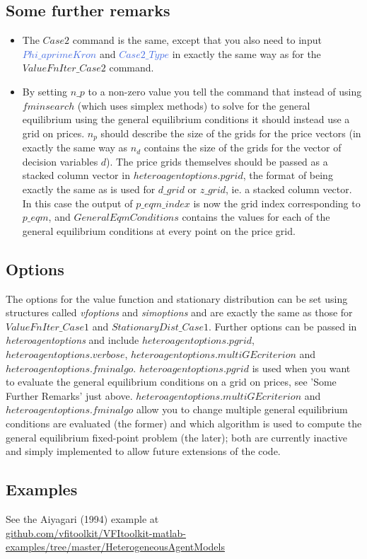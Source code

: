 \subsection{Some further remarks}
\begin{itemize}
 \item The $Case2$ command is the same, except that you also need to input \textcolor{RoyalBlue}{$Phi\_{}aprimeKron$} and \textcolor{RoyalBlue}{$Case2\_{}Type$}
   in exactly the same way as for the $ValueFnIter\_{}Case2$ command.
 \item By setting $n\_{}p$ to a non-zero value you tell the command that instead of using $fminsearch$ (which uses simplex methods) to solve
   for the general equilibrium using the general equilibrium conditions it should instead use a grid on prices. $n_p$ should describe the size of
   the grids for the price vectors (in exactly the same way as $n_d$ contains the size of the grids for the vector of decision variables $d$).
   The price grids themselves should be passed as a stacked column vector in $heteroagentoptions.pgrid$, the format of being exactly the same
   as is used for $d\_{}grid$ or $z\_{}grid$, ie. a stacked column vector. In this case the output of $p\_{}eqm\_{}index$ is now the grid
   index corresponding to $p\_{}eqm$, and $GeneralEqmConditions$ contains the values for each of the general equilibrium conditions at every point
   on the price grid.
\end{itemize}

\subsection{Options}
The options for the value function and stationary distribution can be set using structures called \textit{vfoptions}
and \textit{simoptions} and are exactly the same as those for $ValueFnIter\_{}Case1$ and $StationaryDist\_{}Case1$.
Further options can be passed in \textit{heteroagentoptions} and include $heteroagentoptions.pgrid$, \\
$heteroagentoptions.verbose$, $heteroagentoptions.multiGEcriterion$ and $heteroagentoptions.fminalgo$.
$heteroagentoptions.pgrid$ is used when you want to evaluate the general equilibrium conditions on a grid on prices, see
'Some Further Remarks' just above. $heteroagentoptions.multiGEcriterion$ and $heteroagentoptions.fminalgo$
allow you to change multiple general equilibrium conditions are evaluated (the former) and which algorithm is used
to compute the general equilibrium fixed-point problem (the later); both are currently inactive and simply implemented
to allow future extensions of the code.

\subsection{Examples}
See the Aiyagari (1994) example at \\
\href{https://github.com/vfitoolkit/VFItoolkit-matlab-examples/tree/master/HeterogeneousAgentModels}{github.com/vfitoolkit/VFItoolkit-matlab-examples/tree/master/HeterogeneousAgentModels}


